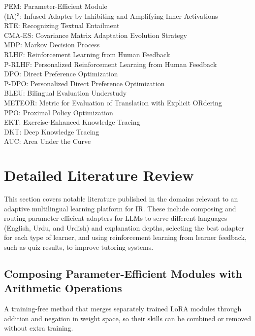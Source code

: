 \documentclass{FastFyp}
\begin{document}
PEM: Parameter-Efficient Module\\
(IA)$^3$: Infused Adapter by Inhibiting and Amplifying Inner Activations\\
RTE: Recognizing Textual Entailment\\
CMA-ES: Covariance Matrix Adaptation Evolution Strategy\\
 MDP: Markov Decision Process\\
 RLHF: Reinforcement Learning from Human Feedback\\
 P-RLHF: Personalized Reinforcement Learning from Human Feedback\\
 DPO: Direct Preference Optimization\\
 P-DPO: Personalized Direct Preference Optimization\\
BLEU: Bilingual Evaluation Understudy\\
METEOR: Metric for Evaluation of Translation with Explicit ORdering\\
PPO: Proximal Policy Optimization\\
EKT: Exercise-Enhanced Knowledge Tracing\\
DKT: Deep Knowledge Tracing\\
AUC: Area Under the Curve

\section{Detailed Literature Review} 
This section covers notable literature published in the domains relevant to an adaptive multilingual learning platform for IR. These include composing and routing parameter-efficient adapters for LLMs to serve different languages (English, Urdu, and Urdish) and explanation depths, selecting the best adapter for each type of learner, and using reinforcement learning from learner feedback, such as quiz results, to improve tutoring systems.

 \subsection{Composing Parameter-Efficient Modules with Arithmetic Operations}
 A training-free method that merges separately trained LoRA modules through addition and negation in weight space, so their skills can be combined or removed without extra training.
\end{document}
